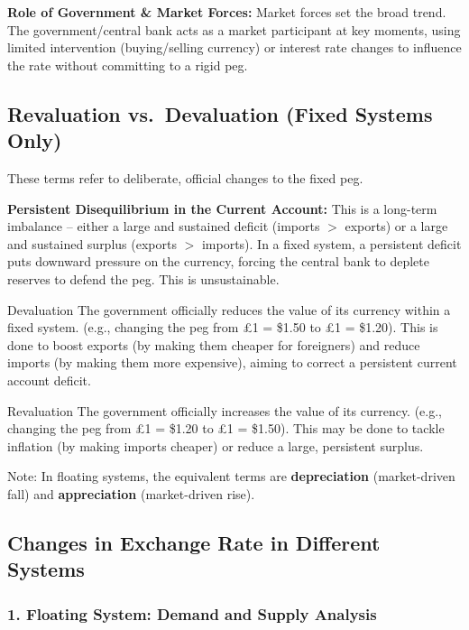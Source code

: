 \documentclass[11pt, a4paper, twoside]{book}
\begin{document}
\textbf{Role of Government \& Market Forces:} Market forces set the broad trend. The government/central bank acts as a market participant at key moments, using limited intervention (buying/selling currency) or interest rate changes to influence the rate without committing to a rigid peg.

\subsection{Revaluation vs.\ Devaluation (Fixed Systems Only)}

These terms refer to deliberate, official changes to the fixed peg.

\textbf{Persistent Disequilibrium in the Current Account:} This is a long-term imbalance -- either a large and sustained deficit (imports $>$ exports) or a large and sustained surplus (exports $>$ imports). In a fixed system, a persistent deficit puts downward pressure on the currency, forcing the central bank to deplete reserves to defend the peg. This is unsustainable.

\begin{keyterm}{Devaluation}
The government officially reduces the value of its currency within a fixed system. (e.g., changing the peg from £1 = \$1.50 to £1 = \$1.20). This is done to boost exports (by making them cheaper for foreigners) and reduce imports (by making them more expensive), aiming to correct a persistent current account deficit.
\end{keyterm}

\begin{keyterm}{Revaluation}
The government officially increases the value of its currency. (e.g., changing the peg from £1 = \$1.20 to £1 = \$1.50). This may be done to tackle inflation (by making imports cheaper) or reduce a large, persistent surplus.
\end{keyterm}

\begin{coreidea}
Note: In floating systems, the equivalent terms are \textbf{depreciation} (market-driven fall) and \textbf{appreciation} (market-driven rise).
\end{coreidea}

\subsection{Changes in Exchange Rate in Different Systems}

\subsubsection{1. Floating System: Demand and Supply Analysis}
\end{document}
